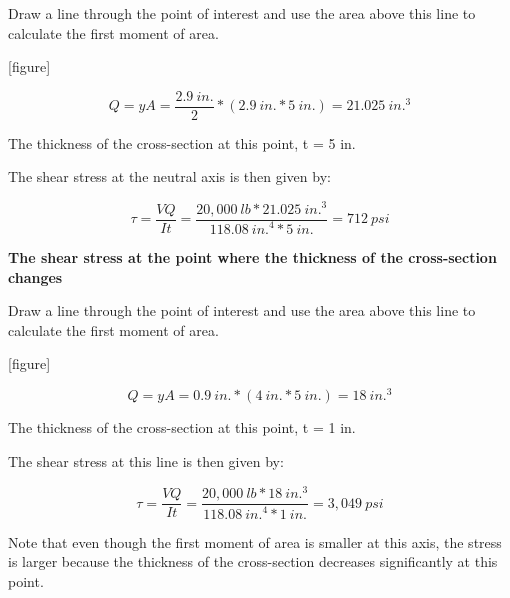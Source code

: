 \documentclass[
  letterpaper,
  DIV=11,
  numbers=noendperiod]{scrreprt}
\begin{document}
\begin{tcolorbox}
\begin{tcolorbox}
Draw a line through the point of interest and use the area above this
line to calculate the first moment of area.

{[}figure{]}

\[
Q=y A=\frac{2.9{~in.}}{2} *(2.9{~in.} * 5{~in.})=21.025{~in.}^3
\]

The thickness of the cross-section at this point, t = 5 in.

The shear stress at the neutral axis is then given by:

\[
\tau=\frac{V Q}{I t}=\frac{20,000{~lb} * 21.025{~in.}^3}{118.08{~in.}^4 * 5{~in.}}=712{~psi}
\]

\textbf{The shear stress at the point where the thickness of the
cross-section changes}

Draw a line through the point of interest and use the area above this
line to calculate the first moment of area.

{[}figure{]}

\[
Q=y A=0.9{~in.} *(4 {~in.}* 5{~in.})=18{~in.}^3
\]

The thickness of the cross-section at this point, t = 1 in.

The shear stress at this line is then given by:

\[
\tau=\frac{V Q}{I t}=\frac{20,000 {~lb}* 18{~in.}^3}{118.08{~in.}^4 * 1{~in.}}=3,049{~psi}
\]

Note that even though the first moment of area is smaller at this axis,
the stress is larger because the thickness of the cross-section
decreases significantly at this point.

\end{tcolorbox}

\end{tcolorbox}
\end{document}

